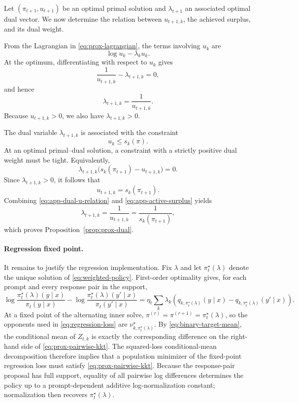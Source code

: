 \documentclass{article}
\theoremstyle{remark}
\theoremstyle{plain}
\begin{document}
Let $(\pi_{t+1},u_{t+1})$ be an optimal primal solution and
$\lambda_{t+1}$ an associated optimal dual vector. We now determine the relation
between $u_{t+1,k}$, the achieved surplus, and its dual weight.

From the Lagrangian in \eqref{eq:prox-lagrangian}, the terms involving $u_k$ are
\[
\log u_k-\lambda_k u_k.
\]
At the optimum, differentiating with respect to $u_k$ gives
\[
\frac{1}{u_{t+1,k}}-\lambda_{t+1,k}=0,
\]
and hence
\begin{equation}
\lambda_{t+1,k}
=
\frac{1}{u_{t+1,k}}.
\label{eq:app-dual-u-relation}
\end{equation}
Because $u_{t+1,k}>0$, we also have $\lambda_{t+1,k}>0$.

The dual variable $\lambda_{t+1,k}$ is associated with the constraint
\[
u_k\le s_k(\pi).
\]
At an optimal primal--dual solution, a constraint with a strictly positive dual
weight must be tight. Equivalently,
\[
\lambda_{t+1,k}
\bigl(
s_k(\pi_{t+1})-u_{t+1,k}
\bigr)
=
0.
\]
Since $\lambda_{t+1,k}>0$, it follows that
\begin{equation}
u_{t+1,k}
=
s_k(\pi_{t+1}).
\label{eq:app-active-surplus}
\end{equation}
Combining \eqref{eq:app-dual-u-relation} and
\eqref{eq:app-active-surplus} yields
\[
\lambda_{t+1,k}
=
\frac{1}{u_{t+1,k}}
=
\frac{1}{s_k(\pi_{t+1})},
\]
which proves Proposition~\ref{prop:prox-dual}.

\paragraph{Regression fixed point.}
It remains to justify the regression implementation. Fix $\lambda$ and let
$\pi_t^\star(\lambda)$ denote the unique solution of
\eqref{eq:weighted-policy}. First-order optimality gives, for each prompt and
every response pair in the support,
\begin{equation}
\log\frac{\pi_t^\star(\lambda)(y\mid x)}{\pi_t(y\mid x)}
-
\log\frac{\pi_t^\star(\lambda)(y'\mid x)}{\pi_t(y'\mid x)}
=
\eta_t\sum_k\lambda_k
\left(
q_{k,\pi_t^\star(\lambda)}(y\mid x)
-
q_{k,\pi_t^\star(\lambda)}(y'\mid x)
\right).
\label{eq:prox-pairwise-kkt}
\end{equation}
At a fixed point of the alternating inner solve,
$\pi^{(r)}=\pi^{(r+1)}=\pi_t^\star(\lambda)$, so the opponents used in
\eqref{eq:regression-loss} are
$\nu^\star_{k,\pi_t^\star(\lambda)}$. By
\eqref{eq:binary-target-mean}, the conditional mean of $Z_{t,k}$ is exactly the
corresponding difference on the right-hand side of
\eqref{eq:prox-pairwise-kkt}. The squared-loss conditional-mean decomposition
therefore implies that a population minimizer of the fixed-point regression loss
must satisfy \eqref{eq:prox-pairwise-kkt}. Because the response-pair proposal has
full support, equality of all pairwise log differences determines the policy up
to a prompt-dependent additive log-normalization constant; normalization then
recovers $\pi_t^\star(\lambda)$.
\end{document}
